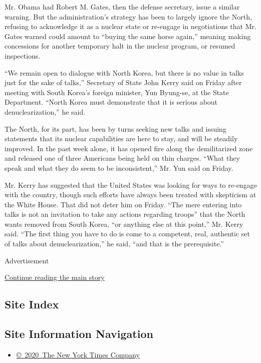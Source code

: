 Mr. Obama had Robert M. Gates, then the defense secretary, issue a
similar warning. But the administration's strategy has been to largely
ignore the North, refusing to acknowledge it as a nuclear state or
re-engage in negotiations that Mr. Gates warned could amount to ``buying
the same horse again,'' meaning making concessions for another temporary
halt in the nuclear program, or resumed inspections.

``We remain open to dialogue with North Korea, but there is no value in
talks just for the sake of talks,'' Secretary of State John Kerry said
on Friday after meeting with South Korea's foreign minister, Yun
Byung-se, at the State Department. ``North Korea must demonstrate that
it is serious about denuclearization,'' he said.

The North, for its part, has been by turns seeking new talks and issuing
statements that its nuclear capabilities are here to stay, and will be
steadily improved. In the past week alone, it has opened fire along the
demilitarized zone and released one of three Americans being held on
thin charges. ``What they speak and what they do seem to be
inconsistent,'' Mr. Yun said on Friday.

Mr. Kerry has suggested that the United States was looking for ways to
re-engage with the country, though such efforts have always been treated
with skepticism at the White House. That did not deter him on Friday.
``The mere entering into talks is not an invitation to take any actions
regarding troops'' that the North wants removed from South Korea, ``or
anything else at this point,'' Mr. Kerry said. ``The first thing you
have to do is come to a competent, real, authentic set of talks about
denuclearization,'' he said, ``and that is the prerequisite.''

Advertisement

\protect\hyperlink{after-bottom}{Continue reading the main story}

\hypertarget{site-index}{%
\subsection{Site Index}\label{site-index}}

\hypertarget{site-information-navigation}{%
\subsection{Site Information
Navigation}\label{site-information-navigation}}

\begin{itemize}
\tightlist
\item
  \href{https://help.nytimes.com/hc/en-us/articles/115014792127-Copyright-notice}{©~2020~The
  New York Times Company}
\end{itemize}

